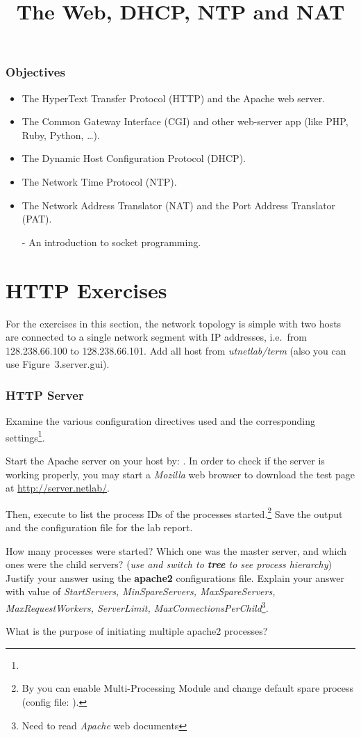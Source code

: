 \documentclass{../UTNetLab}
\title{The Web, DHCP, NTP and NAT}
\begin{document}
\section*{Objectives}
\begin{itemize}
    \item The HyperText Transfer Protocol (HTTP) and the Apache web server.
    \item The Common Gateway Interface (CGI) and other web-server app (like PHP, Ruby, Python, \dots).
    \item The Dynamic Host Configuration Protocol (DHCP).
    \item The Network Time Protocol (NTP).
    \item The Network Address Translator (NAT) and the Port Address Translator (PAT).
    \item [-] An introduction to socket programming.
\end{itemize}

\part{HTTP Exercises}
For the exercises in this section, the network topology is simple with two hosts are connected to a single network segment with IP addresses, i.e.\  from 128.238.66.100 to 128.238.66.101.
Add all host from \textit{utnetlab/term} (also you can use {Figure~3.server.gui}).

\section{HTTP Server}
Examine the various configuration directives used and the corresponding settings\footnote{}.

Start the Apache server on your host by: .
In order to check if the server is working properly, you may start a \textit{Mozilla} web browser to download the test page at \url{http://server.netlab/}.

Then, execute  to list the process IDs of the  processes started.\footnote{By  you can enable Multi-Processing Module and change default spare process (config file: ).}
Save the output and the configuration file for the lab report.

\begin{report}
    \item How many  processes were started?
    Which one was the master server, and which ones were the child servers? (\textit{use  and switch to \textbf{tree} to see process hierarchy})
    Justify your answer using the \textbf{apache2} configurations file.
    Explain your answer with value of \textit{StartServers, MinSpareServers, MaxSpareServers, MaxRequestWorkers, ServerLimit, MaxConnectionsPerChild}\footnote{Need to read \textit{Apache} web documents}.

    \item What is the purpose of initiating multiple apache2 processes?
\end{report}
\end{document}
